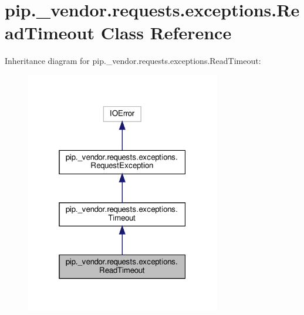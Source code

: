 \hypertarget{classpip_1_1__vendor_1_1requests_1_1exceptions_1_1ReadTimeout}{}\section{pip.\+\_\+vendor.\+requests.\+exceptions.\+Read\+Timeout Class Reference}
\label{classpip_1_1__vendor_1_1requests_1_1exceptions_1_1ReadTimeout}


Inheritance diagram for pip.\+\_\+vendor.\+requests.\+exceptions.\+Read\+Timeout\+:
\nopagebreak
\begin{figure}[H]
\begin{center}
\leavevmode
\includegraphics[width=241pt]{classpip_1_1__vendor_1_1requests_1_1exceptions_1_1ReadTimeout__inherit__graph}
\end{center}
\end{figure}



